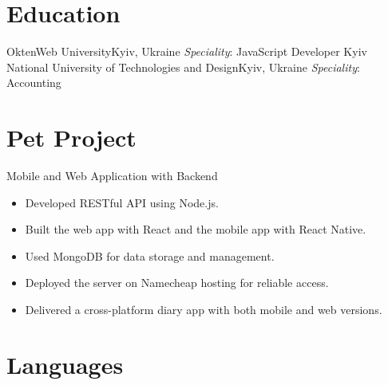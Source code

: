 \documentclass[11pt,a4paper]{moderncv}
\begin{document}
\section{Education}

  {OktenWeb University}{Kyiv, Ukraine}{}
  {\textit{Speciality}: JavaScript Developer}
  {Kyiv National University of Technologies and Design}{Kyiv, Ukraine}{}
  {\textit{Speciality}: Accounting}
  
\section{Pet Project}

  {Mobile and Web Application with Backend{}
   \begin{itemize}
     \item Developed RESTful API using Node.js.
     \item Built the web app with React and the mobile app with React Native.
     \item Used MongoDB for data storage and management.
     \item Deployed the server on Namecheap hosting for reliable access.
     \item Delivered a cross-platform diary app with both mobile and web versions.
   \end{itemize}}


\section{Languages}

\end{document}
